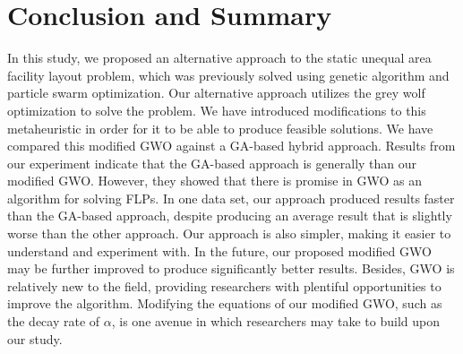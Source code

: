 \chapter{Conclusion and Summary}

In this study, we proposed an alternative approach to the static unequal area facility layout problem, which was previously solved using genetic algorithm and particle swarm optimization. Our alternative approach utilizes the grey wolf optimization to solve the problem. We have introduced modifications to this metaheuristic in order for it to be able to produce feasible solutions. We have compared this modified GWO against a GA-based hybrid approach. Results from our experiment indicate that the GA-based approach is generally than our modified GWO. However, they showed that there is promise in GWO as an algorithm for solving FLPs. In one data set, our approach produced results faster than the GA-based approach, despite producing an average result that is slightly worse than the other approach. Our approach is also simpler, making it easier to understand and experiment with. In the future, our proposed modified GWO may be further improved to produce significantly better results. Besides, GWO is relatively new to the field, providing researchers with plentiful opportunities to improve the algorithm. Modifying the equations of our modified GWO, such as the decay rate of $\alpha$, is one avenue in which researchers may take to build upon our study.
